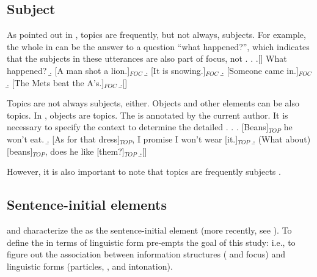 %
%
%

\subsection{Subject}

As pointed out in ,
topics are frequently, but not always, subjects.
For example, the whole  in \Next[a-d] can be the answer to a question ``what happened?'',
which indicates that the subjects in these utterances are also part of focus,
not .
%
\ex.
  \a.[] What happened?
  \b. [A man shot a lion.]$_{FOC}$
  \b. [It is snowing.]$_{FOC}$
  \b. [Someone came in.]$_{FOC}$
  \b. [The Mets beat the A's.]$_{FOC}$
  \b.[] \hfill{\cite[49, modified by NN]{gundel74}}


Topics are not always subjects, either.
Objects and other elements can be also topics.
In \Next,
objects are topics.
The  is annotated by the current author.
It is necessary to specify the context to determine the detailed .
%
\ex.
 \a. [Beans]$_{TOP}$ he won't eat.
 \b. [As for that dress]$_{TOP}$, I promise I won't wear [it.]$_{TOP}$
 \b. (What about) [beans]$_{TOP}$, does he like [them?]$_{TOP}$
 \b.[] \hfill{\cite[27, modified by NN]{gundel74}}

However, it is also important to note that topics are frequently subjects \cite{li76}.


\subsection{Sentence-initial elements}

 and  characterize the  as the sentence-initial element
(more recently, see ).
To define the  in terms of linguistic form pre-empts the goal of this study:
i.e., to figure out the association between information structures ( and focus) and linguistic forms (particles, , and intonation).

